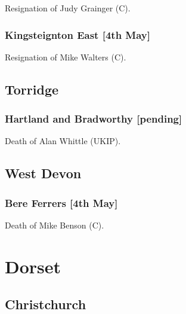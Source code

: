 \documentclass[a4paper,openany]{book}
\begin{document}
\begin{resultsiii}
Resignation of Judy Grainger (C).

\subsubsection*{Kingsteignton East \hspace*{\fill}\nolinebreak[1]%
\enspace\hspace*{\fill}
[4th May]}


Resignation of Mike Walters (C).

\subsection*{Torridge}

\subsubsection*{Hartland and Bradworthy \hspace*{\fill}\nolinebreak[1]%
\enspace\hspace*{\fill}
[pending]}


Death of Alan Whittle (UKIP).

\subsection*{West Devon}

\subsubsection*{Bere Ferrers \hspace*{\fill}\nolinebreak[1]%
\enspace\hspace*{\fill}
[4th May]}


Death of Mike Benson (C).

\section{Dorset}

\subsection*{Christchurch}


\end{resultsiii}
\end{document}
